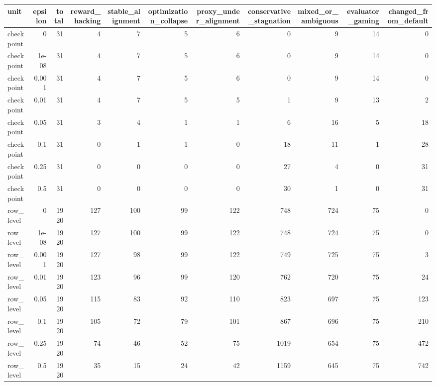 \begin{tabular}{lrrrrrrrrrr}
\toprule
unit & epsilon & total & reward_hacking & stable_alignment & optimization_collapse & proxy_under_alignment & conservative_stagnation & mixed_or_ambiguous & evaluator_gaming & changed_from_default \\
\midrule
checkpoint & 0 & 31 & 4 & 7 & 5 & 6 & 0 & 9 & 14 & 0 \\
checkpoint & 1e-08 & 31 & 4 & 7 & 5 & 6 & 0 & 9 & 14 & 0 \\
checkpoint & 0.001 & 31 & 4 & 7 & 5 & 6 & 0 & 9 & 14 & 0 \\
checkpoint & 0.01 & 31 & 4 & 7 & 5 & 5 & 1 & 9 & 13 & 2 \\
checkpoint & 0.05 & 31 & 3 & 4 & 1 & 1 & 6 & 16 & 5 & 18 \\
checkpoint & 0.1 & 31 & 0 & 1 & 1 & 0 & 18 & 11 & 1 & 28 \\
checkpoint & 0.25 & 31 & 0 & 0 & 0 & 0 & 27 & 4 & 0 & 31 \\
checkpoint & 0.5 & 31 & 0 & 0 & 0 & 0 & 30 & 1 & 0 & 31 \\
row_level & 0 & 1920 & 127 & 100 & 99 & 122 & 748 & 724 & 75 & 0 \\
row_level & 1e-08 & 1920 & 127 & 100 & 99 & 122 & 748 & 724 & 75 & 0 \\
row_level & 0.001 & 1920 & 127 & 98 & 99 & 122 & 749 & 725 & 75 & 3 \\
row_level & 0.01 & 1920 & 123 & 96 & 99 & 120 & 762 & 720 & 75 & 24 \\
row_level & 0.05 & 1920 & 115 & 83 & 92 & 110 & 823 & 697 & 75 & 123 \\
row_level & 0.1 & 1920 & 105 & 72 & 79 & 101 & 867 & 696 & 75 & 210 \\
row_level & 0.25 & 1920 & 74 & 46 & 52 & 75 & 1019 & 654 & 75 & 472 \\
row_level & 0.5 & 1920 & 35 & 15 & 24 & 42 & 1159 & 645 & 75 & 742 \\
\bottomrule
\end{tabular}
